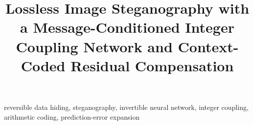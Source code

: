 \documentclass[conference]{IEEEtran}
\begin{document}
\title{Lossless Image Steganography with a Message-Conditioned Integer Coupling Network and Context-Coded Residual Compensation}

\author{
\and
{}
}

\maketitle
\thispagestyle{uct}
\pagestyle{uct}



\begin{IEEEkeywords}
reversible data hiding, steganography, invertible neural network, integer coupling, arithmetic coding, prediction-error expansion
\end{IEEEkeywords}









\end{document}
